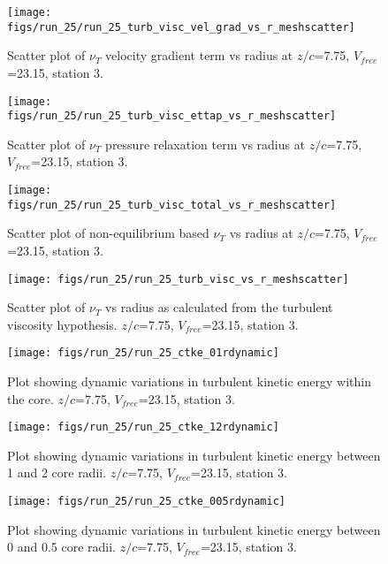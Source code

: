 \begin{figure}[H]
\centering
\texttt{[image: figs/run\_25/run\_25\_turb\_visc\_vel\_grad\_vs\_r\_meshscatter]}
\caption{Scatter plot of $\nu_T$ velocity gradient term vs radius at $z/c$=7.75, $V_{free}$=23.15, station 3.}
\end{figure}


\begin{figure}[H]
\centering
\texttt{[image: figs/run\_25/run\_25\_turb\_visc\_ettap\_vs\_r\_meshscatter]}
\caption{Scatter plot of $\nu_T$ pressure relaxation term vs radius at $z/c$=7.75, $V_{free}$=23.15, station 3.}
\end{figure}


\begin{figure}[H]
\centering
\texttt{[image: figs/run\_25/run\_25\_turb\_visc\_total\_vs\_r\_meshscatter]}
\caption{Scatter plot of non-equilibrium based $\nu_T$ vs radius at $z/c$=7.75, $V_{free}$=23.15, station 3.}
\end{figure}


\begin{figure}[H]
\centering
\texttt{[image: figs/run\_25/run\_25\_turb\_visc\_vs\_r\_meshscatter]}
\caption{Scatter plot of $\nu_T$ vs radius as calculated from the turbulent viscosity hypothesis. $z/c$=7.75, $V_{free}$=23.15, station 3.}
\end{figure}


\begin{figure}[H]
\centering
\texttt{[image: figs/run\_25/run\_25\_ctke\_01rdynamic]}
\caption{Plot showing dynamic variations in turbulent kinetic energy within the core. $z/c$=7.75, $V_{free}$=23.15, station 3.}
\end{figure}


\begin{figure}[H]
\centering
\texttt{[image: figs/run\_25/run\_25\_ctke\_12rdynamic]}
\caption{Plot showing dynamic variations in turbulent kinetic energy between 1 and 2 core radii. $z/c$=7.75, $V_{free}$=23.15, station 3.}
\end{figure}


\begin{figure}[H]
\centering
\texttt{[image: figs/run\_25/run\_25\_ctke\_005rdynamic]}
\caption{Plot showing dynamic variations in turbulent kinetic energy between 0 and 0.5 core radii. $z/c$=7.75, $V_{free}$=23.15, station 3.}
\end{figure}


